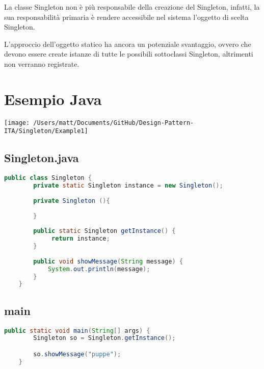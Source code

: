 La classe Singleton non è più responsabile della creazione del Singleton, infatti, la sua responsabilità primaria è rendere accessibile nel sistema l'oggetto di scelta Singleton.

L'approccio dell'oggetto statico ha ancora un potenziale svantaggio, ovvero che devono essere create istanze di tutte le possibili sottoclassi Singleton, altrimenti non verranno registrate.


\section{Esempio Java}
\texttt{[image: /Users/matt/Documents/GitHub/Design-Pattern-ITA/Singleton/Example1]}

\subsection{Singleton.java}
\begin{lstlisting}[language=java]
    public class Singleton {
        private static Singleton instance = new Singleton();
    
        private Singleton (){
    
        }
    
        public static Singleton getInstance() {
             return instance;
        }
    
        public void showMessage(String message) {
            System.out.println(message);
        }
    }
\end{lstlisting}

\subsection{main}
\begin{lstlisting}[language=java]
    public static void main(String[] args) {
        Singleton so = Singleton.getInstance();

        so.showMessage("puppe");
    }
\end{lstlisting}